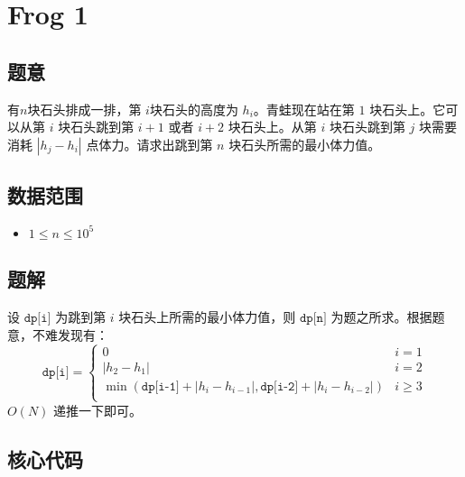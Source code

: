 \section{Frog 1}
\subsection*{题意}
有$n$块石头排成一排，第 $i$块石头的高度为 $h_i$。青蛙现在站在第 $1$ 块石头上。它可以从第 $i$ 块石头跳到第 $i+1$ 或者 $i+2$ 块石头上。从第 $i$ 块石头跳到第 $j$ 块需要消耗 $|h_j - h_i|$ 点体力。请求出跳到第 $n$ 块石头所需的最小体力值。

\subsection*{数据范围}
\begin{itemize}
\item $1\le n\le 10^5$
\end{itemize}


\subsection*{题解}

设 $\texttt{dp[i]}$ 为跳到第 $i$ 块石头上所需的最小体力值，则 $\texttt{dp[n]}$ 为题之所求。根据题意，不难发现有：
\begin{equation*}
{\texttt{dp[i]}} = 
\begin{cases}
 0 & i = 1\\
 |h_2 - h_{1}| & i = 2\\
\min(\texttt{dp[i-1]} + |h_i - h_{i-1}|,\texttt{dp[i-2]} + |h_i - h_{i-2}|) & i \ge 3 \\
\end{cases}
\end{equation*}
$O(N)$ 递推一下即可。
\subsection*{核心代码}
\inputminted[linenos,autogobble]{cpp}{../Code/A.cpp}
\newpage
